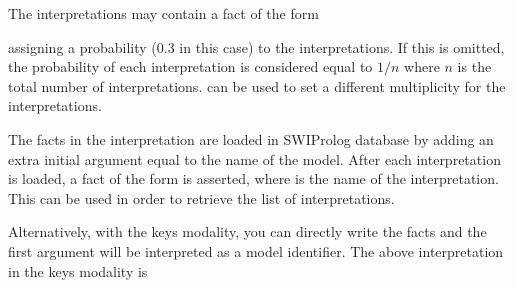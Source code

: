 \documentclass[letterpaper,10pt,english]{sphinxmanual}
\begin{document}
\sphinxAtStartPar
The interpretations may contain a fact of the form

\begin{sphinxVerbatim}[commandchars=\\\{\}]
\end{sphinxVerbatim}

\sphinxAtStartPar
assigning a probability (0.3 in this case) to the interpretations.
If this is omitted, the probability of each interpretation is considered equal to \(1/n\) where \(n\) is the total number of interpretations.  can be used to set a different multiplicity for the interpretations.

\sphinxAtStartPar
The facts in the interpretation are loaded in SWI\sphinxhyphen{}Prolog database by adding an extra initial argument equal to the name of the model.
After each interpretation is loaded, a fact of the form  is asserted, where  is the name of the interpretation.
This can be used in order to retrieve the list of interpretations.

\sphinxAtStartPar
Alternatively, with the keys modality, you can directly write the facts and the first argument will be interpreted as a model identifier.
The above interpretation in the keys modality is

\begin{sphinxVerbatim}[commandchars=\\\{\}]
\end{sphinxVerbatim}
\end{document}
